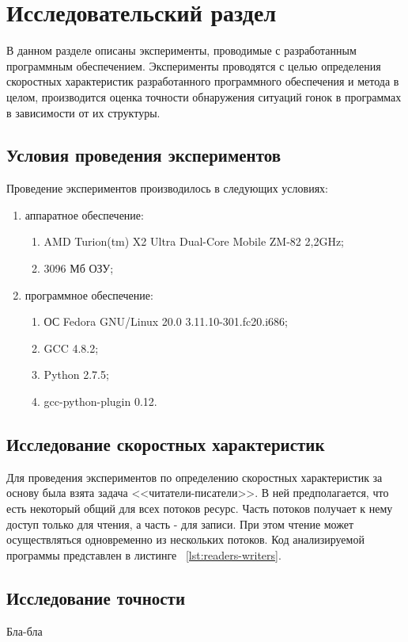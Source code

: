 \chapter{Исследовательский раздел}
\label{cha:research}

В данном разделе описаны эксперименты, проводимые с разработанным программным обеспечением. Эксперименты проводятся с целью определения скоростных характеристик разработанного программного обеспечения и метода в целом, производится оценка точности обнаружения ситуаций гонок в программах в зависимости от их структуры.

\section{Условия проведения экспериментов}

Проведение экспериментов производилось в следующих условиях:
\begin{enumerate}
    \item аппаратное обеспечение:
        \begin{enumerate}
            \item AMD Turion(tm) X2 Ultra Dual-Core Mobile ZM-82 2,2GHz;
            \item 3096 Мб ОЗУ;
        \end{enumerate}
    \item программное обеспечение:
        \begin{enumerate}
            \item ОС Fedora GNU/Linux 20.0 3.11.10-301.fc20.i686;
            \item GCC 4.8.2;
            \item Python 2.7.5;
            \item gcc-python-plugin 0.12.
        \end{enumerate}
\end{enumerate}

\section{Исследование скоростных характеристик}

Для проведения экспериментов по определению скоростных характеристик за основу была взята задача <<читатели-писатели>>. В ней предполагается, что есть некоторый общий для всех потоков ресурс. Часть потоков получает к нему доступ только для чтения, а часть - для записи. При этом чтение может осуществляться одновременно из нескольких потоков. Код анализируемой программы представлен в листинге ~\ref{lst:readers-writers}.



\section{Исследование точности}

Бла-бла
